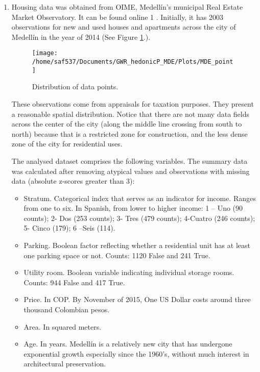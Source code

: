 \documentclass[journal]{IEEEtran}
\begin{document}
\begin{enumerate}
\item Housing data was obtained from OIME, Medellín’s municipal Real Estate Market Observatory. It can be found online 1 . Initially, it has 2003 observations for new and used houses and apartments across the city of Medellín in the year of 2014 (See Figure \ref{fig_sim}.).


\begin{figure}[!t]
\centering
\texttt{[image: /home/saf537/Documents/GWR\_hedonicP\_MDE/Plots/MDE\_point]}
\caption{Distribution of data points.}
\label{fig_sim}
\end{figure}

These observations come from appraisals for
taxation purposes. They present a reasonable spatial
distribution. Notice that there are not many data
fields across the center of the city (along the middle
line crossing from south to north) because that is a
restricted zone for construction, and the less dense
zone of the city for residential uses.

The analysed dataset comprises the following
variables. The summary data was calculated after
removing atypical values and observations with
missing data (absolute z-scores greater than 3):

\begin{itemize}
\item Stratum. Categorical index that serves as an
indicator for income. Ranges from one to six. In
Spanish, from lower to higher income: 1 – Uno
(90 counts); 2- Dos (253 counts); 3- Tres (479 counts); 4-Cuatro (246 counts); 5- Cinco (179);
6 –Seis (114).

\item Parking. Boolean factor reflecting whether a residential unit has at least one parking space or not. Counts: 1120 False and 241 True.

\item Utility room. Boolean variable indicating individual storage rooms. Counts: 944 False and 417 True.

\item Price. In COP. By November of 2015, One US Dollar costs around three thousand Colombian pesos.

\item Area. In squared meters.

\item Age. In years. Medellín is a relatively new city that has undergone exponential growth especially since the 1960’s, without much
interest in architectural preservation. 


\end{itemize}
\end{enumerate}
\end{document}
